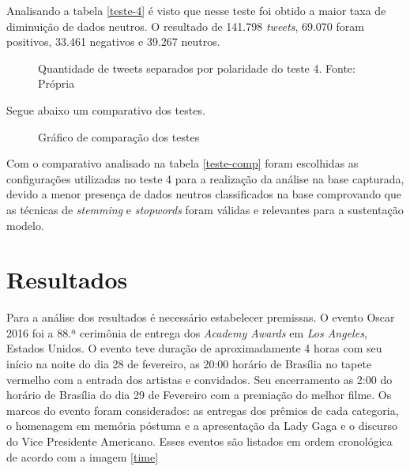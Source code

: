 Analisando a tabela \ref{teste-4} é visto que nesse teste foi obtido a maior taxa de diminuição de dados neutros. O resultado de 141.798 \textit{tweets}, 69.070 foram positivos, 33.461 negativos e 39.267 neutros.



\begin{figure}[!h]
	\centering{}
	\caption{Quantidade de tweets separados por polaridade do teste 4. Fonte: Própria}
	\label{teste-graf-4}
\end{figure}
Segue abaixo um comparativo dos testes.

\begin{table}[]		
	\caption{Comparando testes}
	\label{teste-comp}
\end{table}

\begin{figure}[!h]
	\centering{}
	\caption{Gráfico de comparação dos testes}
	\label{teste-graf-comp}
\end{figure}


Com o comparativo analisado na tabela \ref{teste-comp} foram escolhidas as configurações utilizadas no teste 4 para a realização da análise na base capturada, devido a menor presença de dados neutros classificados na base comprovando que as técnicas de \textit{stemming} e \textit{stopwords} foram válidas e relevantes para a sustentação modelo.

\section{Resultados}\label{result}

Para a análise dos resultados é necessário estabelecer premissas. O evento Oscar 2016 foi a  88.ª cerimônia de entrega dos \textit{Academy Awards} em \textit{Los Angeles}, Estados Unidos. O evento teve duração de aproximadamente 4 horas com seu início na noite do dia 28 de fevereiro, as 20:00 horário de Brasília no tapete vermelho com a entrada dos artistas e convidados. Seu encerramento as 2:00 do horário de Brasília do dia 29 de Fevereiro com a premiação do melhor filme. Os marcos do evento foram considerados: as entregas dos prêmios de cada categoria, o homenagem em memória póstuma e a apresentação da Lady Gaga e o discurso do Vice Presidente Americano. Esses eventos  são listados em ordem cronológica de acordo com a imagem \ref{time}

